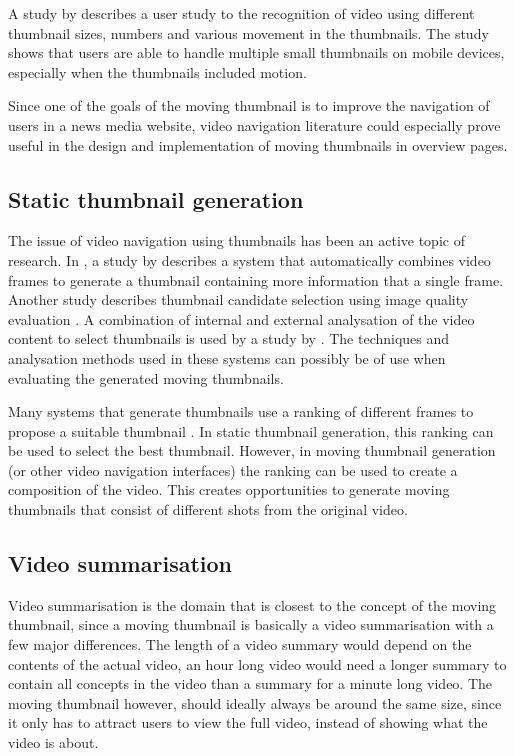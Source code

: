 \documentclass{../resources/acm_proc_article-sp}
\begin{document}
A study by \textcite{Hurst:2011jx} describes a user study to the recognition of video using different thumbnail sizes, numbers and various movement in the thumbnails. The study shows that users are able to handle multiple small thumbnails on mobile devices, especially when the thumbnails included motion.

Since one of the goals of the moving thumbnail is to improve the navigation of users in a news media website, video navigation literature could especially prove useful in the design and implementation of moving thumbnails in overview pages.

\subsection{Static thumbnail generation}

The issue of video navigation using thumbnails has been an active topic of research. In \citeyear{Kim:2015co}, a study by \textcite{Kim:2015co} describes a system that automatically combines video frames to generate a thumbnail containing more information that a single frame. Another study describes thumbnail candidate selection using image quality evaluation \cite{Zhang:2014jg}. A combination of internal and external analysation of the video content to select thumbnails is used by a study by \textcite{Liu:2015ux}. The techniques and analysation methods used in these systems can possibly be of use when evaluating the generated moving thumbnails.

Many systems that generate thumbnails use a ranking of different frames to propose a suitable thumbnail \cite{Choi:2015gm,Zhang:2012eo,Gao:2009dx}. In static thumbnail generation, this ranking can be used to select the best thumbnail. However, in moving thumbnail generation (or other video navigation interfaces) the ranking can be used to create a composition of the video. This creates opportunities to generate moving thumbnails that consist of different shots from the original video.

\subsection{Video summarisation}

Video summarisation is the domain that is closest to the concept of the moving thumbnail, since a moving thumbnail is basically a video summarisation with a few major differences. The length of a video summary would depend on the contents of the actual video, an hour long video would need a longer summary to contain all concepts in the video than a summary for a minute long video. The moving thumbnail however, should ideally always be around the same size, since it only has to attract users to view the full video, instead of showing what the video is about.
\end{document}
